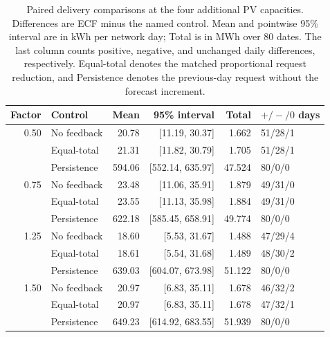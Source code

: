 \documentclass[11pt]{article}
\begin{document}
\begin{table}[!htbp]
\centering
\caption{Paired delivery comparisons at the four additional PV capacities.
Differences are ECF minus the named control. Mean and pointwise 95\% interval
are in kWh per network day; Total is in MWh over 80 dates. The last column
counts positive, negative, and unchanged daily differences, respectively.
Equal-total denotes the matched proportional request reduction, and
Persistence denotes the previous-day request without the forecast increment.}
\label{tab:supp_pv_contrasts}
\small
\begin{tabular}{@{}rlrrrl@{}}
\toprule
Factor & Control & Mean & 95\% interval & Total & $+/-/0$ days \\
\midrule
0.50 & No feedback & 20.78 & [11.19, 30.37] & 1.662 & 51/28/1 \\
     & Equal-total & 21.31 & [11.82, 30.79] & 1.705 & 51/28/1 \\
     & Persistence & 594.06 & [552.14, 635.97] & 47.524 & 80/0/0 \\
\midrule
0.75 & No feedback & 23.48 & [11.06, 35.91] & 1.879 & 49/31/0 \\
     & Equal-total & 23.55 & [11.13, 35.98] & 1.884 & 49/31/0 \\
     & Persistence & 622.18 & [585.45, 658.91] & 49.774 & 80/0/0 \\
\midrule
1.25 & No feedback & 18.60 & [5.53, 31.67] & 1.488 & 47/29/4 \\
     & Equal-total & 18.61 & [5.54, 31.68] & 1.489 & 48/30/2 \\
     & Persistence & 639.03 & [604.07, 673.98] & 51.122 & 80/0/0 \\
\midrule
1.50 & No feedback & 20.97 & [6.83, 35.11] & 1.678 & 46/32/2 \\
     & Equal-total & 20.97 & [6.83, 35.11] & 1.678 & 47/32/1 \\
     & Persistence & 649.23 & [614.92, 683.55] & 51.939 & 80/0/0 \\
\bottomrule
\end{tabular}
\end{table}
\end{document}
